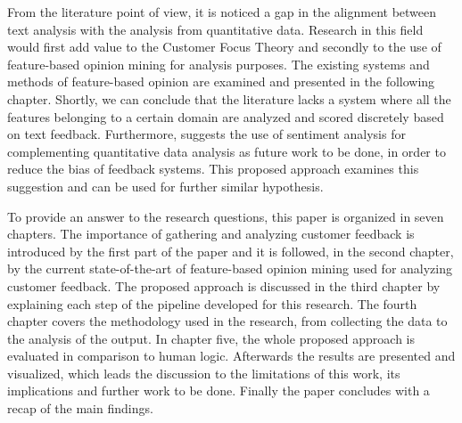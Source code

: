 From the literature point of view, it is noticed a gap in the alignment between text analysis with the analysis from quantitative data. Research in this field would first add value to the Customer Focus Theory and secondly to the use of feature-based opinion mining for analysis purposes. The existing systems and methods of feature-based opinion are examined and presented in the following chapter. Shortly, we can conclude that the literature lacks a system where all the features belonging to a certain domain are analyzed and scored discretely based on text feedback. Furthermore, \cite{fradkin2016bias} suggests the use of sentiment analysis for complementing quantitative data analysis as future work to be done, in order to reduce the bias of feedback systems. This proposed approach examines this suggestion and can be used for further similar hypothesis.

To provide an answer to the research questions, this paper is organized in seven chapters. The importance of gathering and analyzing customer feedback is introduced by the first part of the paper and it is followed, in the second chapter, by the current state-of-the-art of feature-based opinion mining used for analyzing customer feedback. The proposed approach is discussed in the third chapter by explaining each step of the pipeline developed for this research. The fourth chapter covers the methodology used in the research, from collecting the data to the analysis of the output. In chapter five, the whole proposed approach is evaluated in comparison to human logic. Afterwards the results are presented and visualized, which leads the discussion to the limitations of this work, its implications and further work to be done. Finally the paper concludes with a recap of the main findings. 